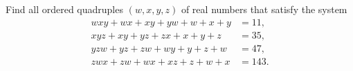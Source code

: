 Find all ordered quadruples $(w,x,y,z)$ of real numbers that satisfy the system
\[
\begin{aligned}
wxy+wx+xy+yw+w+x+y&=11,\\
xyz+xy+yz+zx+x+y+z&=35,\\
yzw+yz+zw+wy+y+z+w&=47,\\
zwx+zw+wx+xz+z+w+x&=143.
\end{aligned}
\]
